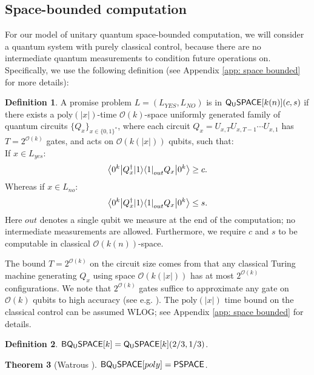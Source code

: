 \documentclass[11pt]{article}
\newtheorem{theorem}{Theorem}
\theoremstyle{definition}
\newtheorem{definition}[theorem]{Definition}
\theoremstyle{remark}
\newcommand\QSPACE{{\sf{Q_{U}SPACE}}}
\newcommand\PQSPACE{{\sf{PQ_{U}SPACE}}}
\newcommand\BQSPACE{{\sf{BQ_{U}SPACE}}}
\newcommand\PSPACE{{\sf{PSPACE}}}
\newcommand\bigoh{\mathcal{O}}
\newcommand{\poly}{\textrm{poly}}
\begin{document}
\subsection{Space-bounded computation} \label{sec: space bounded computation}
For our model of unitary quantum space-bounded computation, we will consider a quantum system with purely classical control, because there are no intermediate quantum measurements to condition future operations on. Specifically, we use the following definition (see Appendix \ref{app: space bounded} for more details):

\begin{definition} \label{def: qspace}
A promise problem $L=(L_{YES},L_{NO})$ is in $\QSPACE[k(n)](c,s)$ if there exists a $\poly(|x|)$-time $\mathcal{O}(k)$-space uniformly generated family of quantum circuits $\{Q_x\}_{x\in\{0,1\}^*}$, where each circuit $Q_x=U_{x,T}U_{x,T-1}\cdots U_{x,1}$ has $T=2^{\mathcal{O}(k)}$ gates, and acts on $\mathcal{O}(k(|x|))$ qubits, such that:\\
 If $x \in L_{yes}$:
\begin{equation}
{\left\langle{0^k}\right\vert} Q^\dagger_x {\left\vert{1}\right\rangle}{\left\langle{1}\right\vert}_{out} Q_x {\left\vert{0^k}\right\rangle} \ge c.
\end{equation}
Whereas if $x \in L_{no}$:
\begin{equation}
{\left\langle{0^k}\right\vert} Q^\dagger_x {\left\vert{1}\right\rangle}{\left\langle{1}\right\vert}_{out} Q_x {\left\vert{0^k}\right\rangle} \le s.
\end{equation}
Here $out$ denotes a single qubit we measure at the end of the computation; no intermediate measurements are allowed.  
Furthermore, we require $c$ and $s$ to be computable in classical $\bigoh(k(n))$-space.
\end{definition}

The bound $T=2^{\mathcal{O}(k)}$ on the circuit size comes from that any classical Turing machine generating $Q_x$ using space $\bigoh(k(|x|))$ has at most $2^{\mathcal{O}(k)}$ configurations. We note that $2^{\mathcal{O}(k)}$ gates suffice to approximate any gate on $\bigoh(k)$ qubits to high accuracy (see e.g. \cite[Chapter~4]{nc00}). The $\poly(|x|)$ time bound on the classical control can be assumed WLOG; see Appendix \ref{app: space bounded} for details.

\begin{definition} $\BQSPACE[k]=\QSPACE[k](2/3,1/3)$.\end{definition}
\begin{theorem}[Watrous \cite{Watrous99}]\label{thm:pqpspace} $\BQSPACE[poly]=\PSPACE$.
\end{theorem}
\end{document}

